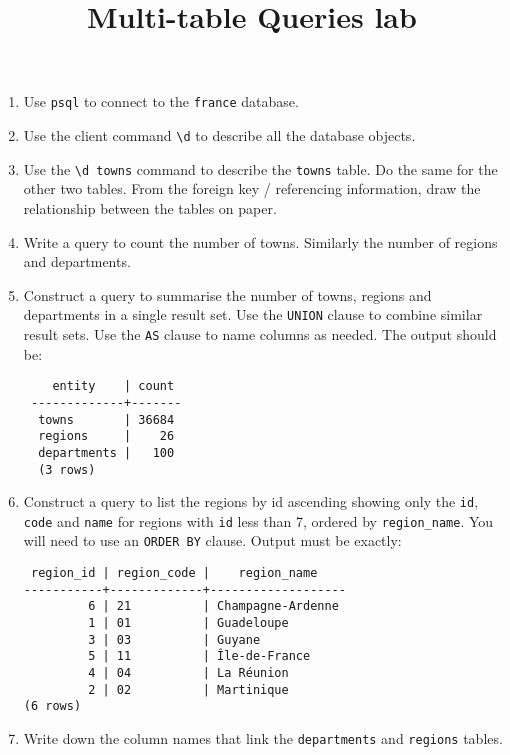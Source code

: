 \title{Multi-table Queries lab}

\begin{enumerate}

\item Use \texttt{psql} to connect to the \texttt{france} database.

\item Use the client command \texttt{\textbackslash d} to describe all the database objects.

\item Use the \texttt{\textbackslash d towns} command to describe the \texttt{towns} table.
  Do the same for the other two tables.
  From the foreign key / referencing information, draw the relationship between the tables on paper. 

\item Write a query to count the number of towns.
  Similarly the number of regions and departments. 
  
\item Construct a query to summarise the number of towns, regions and departments in a single result set.
  Use the \texttt{UNION} clause to combine similar result sets.
  Use the \texttt{AS} clause to name columns as needed.
  The output should be:
\begin{verbatim}
    entity    | count
 -------------+-------
  towns       | 36684
  regions     |    26
  departments |   100
  (3 rows)
\end{verbatim}

\item Construct a query to list the regions by id ascending showing only the \texttt{id}, \texttt{code} and \texttt{name} for regions with \texttt{id} less than 7, ordered by \texttt{region\_name}.
  You will need to use an \texttt{ORDER BY} clause.
  Output must be exactly:
\begin{verbatim}
 region_id | region_code |    region_name
-----------+-------------+-------------------
         6 | 21          | Champagne-Ardenne
         1 | 01          | Guadeloupe
         3 | 03          | Guyane
         5 | 11          | Île-de-France
         4 | 04          | La Réunion
         2 | 02          | Martinique
(6 rows)
\end{verbatim}
  \label{step:region-list}

\item Write down the column names that link the \texttt{departments} and \texttt{regions} tables.


\end{enumerate}
